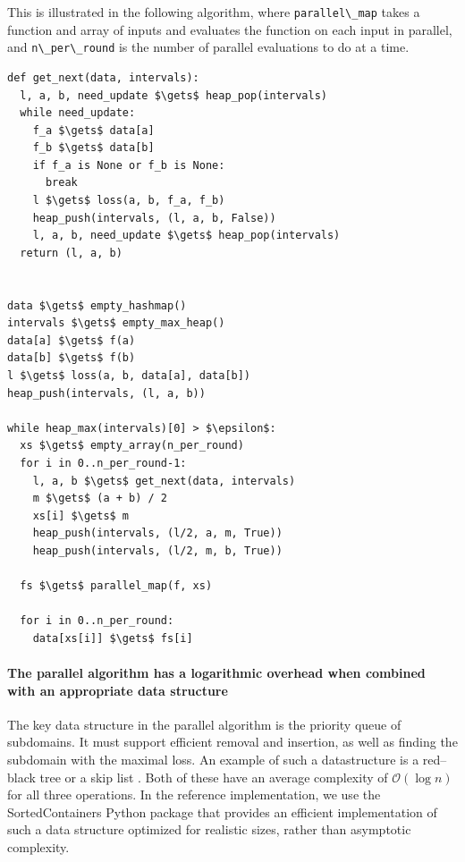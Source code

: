 \documentclass[english, twocolumn, 10pt, aps, superscriptaddress, floatfix, prb, citeautoscript]{revtex4-1}
\newcommand{\passthrough}[1]{\lstset{mathescape=false}#1\lstset{mathescape=true}}
\begin{document}
This is illustrated in the following algorithm, where \passthrough{\lstinline!parallel\_map!} takes a function and array of inputs and evaluates the function on each input in parallel, and \passthrough{\lstinline!n\_per\_round!} is the number of parallel evaluations to do at a time.

\begin{lstlisting}
def get_next(data, intervals):
  l, a, b, need_update $\gets$ heap_pop(intervals)
  while need_update:
    f_a $\gets$ data[a]
    f_b $\gets$ data[b]
    if f_a is None or f_b is None:
      break
    l $\gets$ loss(a, b, f_a, f_b)
    heap_push(intervals, (l, a, b, False))
    l, a, b, need_update $\gets$ heap_pop(intervals)
  return (l, a, b)


data $\gets$ empty_hashmap()
intervals $\gets$ empty_max_heap()
data[a] $\gets$ f(a)
data[b] $\gets$ f(b)
l $\gets$ loss(a, b, data[a], data[b])
heap_push(intervals, (l, a, b))

while heap_max(intervals)[0] > $\epsilon$:
  xs $\gets$ empty_array(n_per_round)
  for i in 0..n_per_round-1:
    l, a, b $\gets$ get_next(data, intervals)
    m $\gets$ (a + b) / 2
    xs[i] $\gets$ m
    heap_push(intervals, (l/2, a, m, True))
    heap_push(intervals, (l/2, m, b, True))

  fs $\gets$ parallel_map(f, xs)

  for i in 0..n_per_round:
    data[xs[i]] $\gets$ fs[i]
\end{lstlisting}

\hypertarget{the-parallel-algorithm-has-a-logarithmic-overhead-when-combined-with-an-appropriate-data-structure}{%
\paragraph{The parallel algorithm has a logarithmic overhead when combined with an appropriate data structure}\label{the-parallel-algorithm-has-a-logarithmic-overhead-when-combined-with-an-appropriate-data-structure}}

The key data structure in the parallel algorithm is the priority queue of subdomains.
It must support efficient removal and insertion, as well as finding the subdomain with the maximal loss.
An example of such a datastructure is a red--black tree or a skip list .
Both of these have an average complexity of \(\mathcal{O}(\log{n})\) for all three operations.
In the reference implementation, we use the SortedContainers Python package that provides an efficient implementation of such a data structure optimized for realistic sizes, rather than asymptotic complexity.
\end{document}
